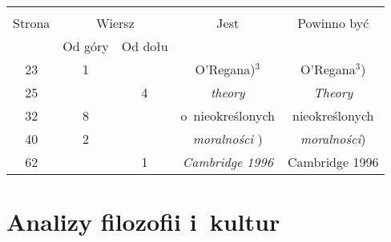 \documentclass[a4paper,11pt]{article}
\begin{document}
\begin{center}

  \begin{tabular}{|c|c|c|c|c|}
    \hline
    & \multicolumn{2}{c|}{} & & \\
    Strona & \multicolumn{2}{c|}{Wiersz} & Jest
                              & Powinno być \\ \cline{2-3}
    & Od góry & Od dołu & & \\
    \hline
    23  &  1 & & O’Regana)$^{ 3 }$ & O’Regana$^{ 3 }$) \\
    25  & &  4 & \textit{theory} & \textit{Theory} \\
    32  &  8 & & o~nieokreślonych & nieokreślonych \\
    40  &  2 & & \textit{moralności} ) & \textit{moralności}) \\
    62  & &  1 & \textit{Cambridge 1996} & Cambridge 1996  \\
    \hline
  \end{tabular}

\end{center}

\vspace{\spaceTwo}













\newpage
\section{Analizy filozofii i~kultur}

\vspace{\spaceTwo}



\end{document}
